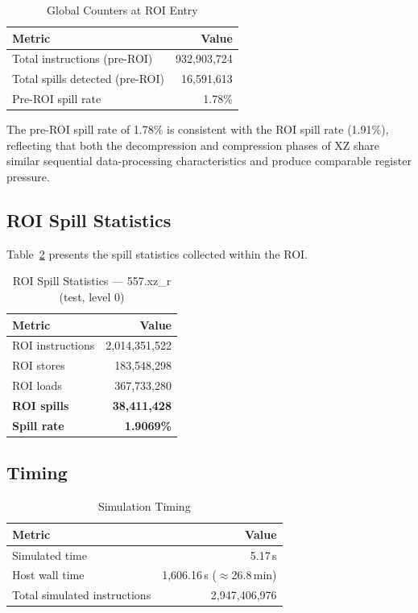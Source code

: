 \documentclass[conference]{IEEEtran}
\begin{document}
\begin{table}[H]
\centering
\caption{Global Counters at ROI Entry}
\label{tab:preroi}
\begin{tabular}{lr}
\toprule
\textbf{Metric} & \textbf{Value} \\
\midrule
Total instructions (pre-ROI) & 932,903,724 \\
Total spills detected (pre-ROI) & 16,591,613 \\
Pre-ROI spill rate & 1.78\% \\
\bottomrule
\end{tabular}
\end{table}

The pre-ROI spill rate of 1.78\% is consistent with the ROI spill
rate (1.91\%), reflecting that both the decompression and compression
phases of XZ share similar sequential data-processing characteristics
and produce comparable register pressure.

\subsection{ROI Spill Statistics}

Table~\ref{tab:roi} presents the spill statistics collected within
the ROI.

\begin{table}[H]
\centering
\caption{ROI Spill Statistics --- 557.xz\_r (test, level 0)}
\label{tab:roi}
\begin{tabular}{lr}
\toprule
\textbf{Metric} & \textbf{Value} \\
\midrule
ROI instructions         & 2,014,351,522 \\
ROI stores               &   183,548,298 \\
ROI loads                &   367,733,280 \\
\midrule
\textbf{ROI spills}      & \textbf{38,411,428} \\
\textbf{Spill rate}      & \textbf{1.9069\%} \\
\bottomrule
\end{tabular}
\end{table}

\subsection{Timing}

\begin{table}[H]
\centering
\caption{Simulation Timing}
\label{tab:timing}
\begin{tabular}{lr}
\toprule
\textbf{Metric} & \textbf{Value} \\
\midrule
Simulated time           & 5.17\,s \\
Host wall time           & 1{,}606.16\,s ($\approx$26.8\,min) \\
Total simulated instructions & 2,947,406,976 \\
\bottomrule
\end{tabular}
\end{table}
\end{document}
